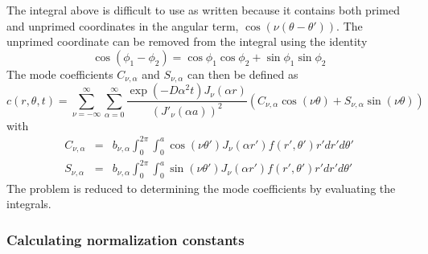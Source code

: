 The integral above is difficult to use as written because it contains both primed and unprimed coordinates in the angular term, $\cos\left(\nu(\theta -\theta')\right)$.  The unprimed coordinate can be removed from the integral using the identity $$\cos(\phi_1-\phi_2) = \cos\phi_1\cos\phi_2 + \sin\phi_1\sin\phi_2$$ The mode coefficients $C_{\nu,\alpha}$ and $S_{\nu,\alpha}$ can then be defined as
\begin{equation}
c(r,\theta,t) = \sum_{\nu=-\infty}^{\infty} \sum_{\alpha = 0}^\infty   \frac{\exp\left(-D\alpha^2t\right)J_\nu\left(\alpha r\right)}{\left(J'_\nu (\alpha a)\right)^2} \left(C_{\nu,\alpha}\cos(\nu\theta) + S_{\nu,\alpha} \sin(\nu\theta)\right)
\label{eq:c-s-series}
\end{equation}
with 
\begin{eqnarray}
C_{\nu,\alpha} & = &b_{\nu,\alpha} \int_0^{2\pi} \int_0^a \cos\left(\nu\theta'\right) J_\nu(\alpha r')f(r',\theta') r' dr' d\theta' \label{eq:cos-defn}\\
S_{\nu,\alpha} & = & b_{\nu,\alpha}\int_0^{2\pi} \int_0^a \sin\left(\nu\theta'\right) J_\nu(\alpha r') f(r',\theta') r' dr' d\theta' \label{eq:sin-defn}
\end{eqnarray}
The problem is reduced to determining the mode coefficients by evaluating the integrals.

\subsubsection{Calculating normalization constants}

